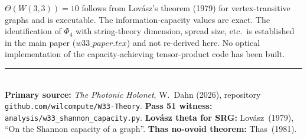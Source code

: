 \documentclass[11pt]{article}
\begin{document}
\begin{honestbox}
$\Theta(W(3,3)) = 10$ follows from Lov\'asz's theorem (1979) for vertex-transitive
graphs and is executable. The information-capacity values are exact.
The identification of $\Phi_4$ with string-theory dimension, spread size, etc.\
is established in the main paper ($w33\_paper.tex$) and not re-derived here.
No optical implementation of the capacity-achieving tensor-product code has been built.
\end{honestbox}

\bigskip
\noindent\rule{\linewidth}{0.4pt}\\[0.3em]
{\footnotesize
\textbf{Primary source:} \emph{The Photonic Holonet}, W.~Dahn (2026), repository
\texttt{github.com/wilcompute/W33-Theory}.
\textbf{Pass 51 witness:} \texttt{analysis/w33\_shannon\_capacity.py}.
\textbf{Lov\'asz theta for SRG:} Lov\'asz~(1979), ``On the Shannon capacity of a graph''.
\textbf{Thas no-ovoid theorem:} Thas~(1981).
}
\end{document}
